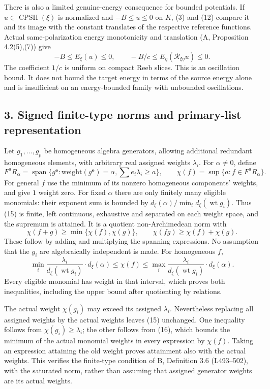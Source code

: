 \documentclass[
  11pt,
]{article}
\begin{document}
There is also a limited genuine-energy consequence for bounded
potentials. If \(u\in\operatorname{CPSH}(\xi)\) is normalized and
\(-B\leq u\leq0\) on \(K\), (3) and (12) compare it and its image with
the constant translates of the respective reference functions. Actual
same-polarization energy monotonicity and translation (A, Proposition
4.2(5),(7)) give \[
 -B\leq E_\xi(u)\leq0,\qquad
 -B/c\leq E_\eta(\mathcal R_{\xi\eta}u)\leq0.
\] The coefficient \(1/c\) is uniform on compact Reeb slices. This is an
oscillation bound. It does not bound the target energy in terms of the
source energy alone and is insufficient on an energy-bounded family with
unbounded oscillations.

\subsection{3. Signed finite-type norms and primary-list
representation}\label{signed-finite-type-norms-and-primary-list-representation}

Let \(g_1,\ldots,g_p\) be homogeneous algebra generators, allowing
additional redundant homogeneous elements, with arbitrary real assigned
weights \(\lambda_i\). For \(\alpha\ne0\), define \[
 F^a R_\alpha=\operatorname{span}\{g^{\mathbf e}:
              \text{weight}(g^{\mathbf e})=\alpha,
              \sum e_i\lambda_i\geq a\},\qquad
 \chi(f)=\sup\{a:f\in F^a R_\alpha\}.                \tag{15}
\] For general \(f\) use the minimum of its nonzero homogeneous
components' weights, and give \(1\) weight zero. For fixed \(\alpha\)
there are only finitely many eligible monomials: their exponent sum is
bounded by \(d_\xi(\alpha)/\min_i d_\xi(\operatorname{wt}g_i)\). Thus
(15) is finite, left continuous, exhaustive and separated on each weight
space, and the supremum is attained. It is a quotient non-Archimedean
norm with \[
 \chi(f+g)\geq\min\{\chi(f),\chi(g)\},\qquad
 \chi(fg)\geq\chi(f)+\chi(g).                        \tag{16}
\] These follow by adding and multiplying the spanning expressions. No
assumption that the \(g_i\) are algebraically independent is made. For
homogeneous \(f\), \[
 \min_i\frac{\lambda_i}{d_\xi(\operatorname{wt}g_i)}\cdot d_\xi(\alpha)
 \leq\chi(f)\leq
 \max_i\frac{\lambda_i}{d_\xi(\operatorname{wt}g_i)}\cdot d_\xi(\alpha).
 \tag{17}
\] Every eligible monomial has weight in that interval, which proves
both inequalities, including the upper bound after quotienting by
relations.

The actual weight \(\chi(g_i)\) may exceed its assigned \(\lambda_i\).
Nevertheless replacing all assigned weights by the actual weights leaves
(15) unchanged. One inequality follows from \(\chi(g_i)\geq\lambda_i\);
the other follows from (16), which bounds the minimum of the actual
monomial weights in every expression by \(\chi(f)\). Taking an
expression attaining the old weight proves attainment also with the
actual weights. This verifies the finite-type condition of B, Definition
3.6 (L493--502), with the saturated norm, rather than assuming that
assigned generator weights are its actual weights.
\end{document}
